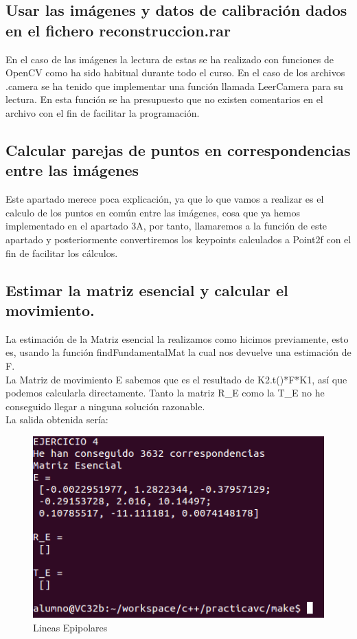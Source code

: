\subsection{Usar las imágenes y datos de calibración dados en el fichero reconstruccion.rar}

En el caso de las imágenes la lectura de estas se ha realizado con funciones de OpenCV como ha sido habitual durante todo el curso. En el caso de los archivos .camera se ha tenido que implementar una función llamada LeerCamera para su lectura. En esta función se ha presupuesto que no existen comentarios en el archivo con el fin de facilitar la programación.

\subsection{Calcular parejas de puntos en correspondencias entre las imágenes }

Este apartado merece poca explicación, ya que lo que vamos a realizar es el calculo de los puntos en común entre las imágenes, cosa que ya hemos implementado en el apartado 3A, por tanto, llamaremos a la función de este apartado y posteriormente convertiremos los keypoints calculados a Point2f con el fin de facilitar los cálculos.

\subsection{Estimar la matriz esencial y calcular el movimiento.}
La estimación de la Matriz esencial la realizamos como hicimos previamente, esto es, usando la función findFundamentalMat la cual nos devuelve una estimación de F.\\

La Matriz de movimiento E sabemos que es el resultado de K2.t()*F*K1, así que podemos calcularla directamente. Tanto la matriz R\_E como la T\_E no he conseguido llegar a ninguna solución razonable.\\

La salida obtenida sería:


\begin{figure}[H]
	\centering
	\includegraphics[width=0.9\linewidth]{ej4}
	\caption{Lineas Epipolares}
\end{figure}


